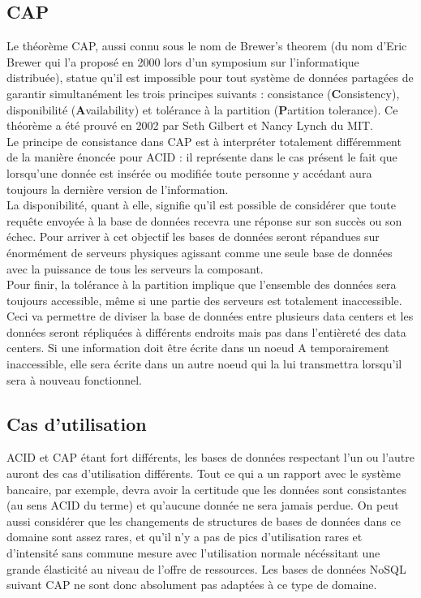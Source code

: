 \documentclass[11pt]{article}
\begin{document}
\subsection{CAP}
Le théorème CAP, aussi connu sous le nom de Brewer's theorem (du nom d'Eric Brewer qui l'a proposé en 2000 lors d'un symposium sur l'informatique distribuée), statue qu'il est impossible pour tout système de données partagées de garantir simultanément les trois principes suivants : consistance (\textbf{C}onsistency), disponibilité (\textbf{A}vailability) et tolérance à la partition (\textbf{P}artition tolerance). Ce théorème a été prouvé en 2002 par Seth Gilbert et Nancy Lynch du MIT\cite{cap}. \\
Le principe de consistance dans CAP est à interpréter totalement différemment de la manière énoncée pour ACID : il représente dans le cas présent le fait que lorsqu'une donnée est insérée ou modifiée toute personne y accédant aura toujours la dernière version de l'information. \\
La disponibilité, quant à elle, signifie qu'il est possible de considérer que toute requête envoyée à la base de données recevra une réponse sur son succès ou son échec. Pour arriver à cet objectif les bases de données seront répandues sur énormément de serveurs physiques agissant comme une seule base de données avec la puissance de tous les serveurs la composant. \\
Pour finir, la tolérance à la partition implique que l'ensemble des données sera toujours accessible, même si une partie des serveurs est totalement inaccessible. Ceci va permettre de diviser la base de données entre plusieurs data centers et les données seront répliquées à différents endroits mais pas dans l'entièreté des data centers. Si une information doit être écrite dans un noeud A temporairement inaccessible, elle sera écrite dans un autre noeud qui la lui transmettra lorsqu'il sera à nouveau fonctionnel. 
\subsection{Cas d'utilisation}
ACID et CAP étant fort différents, les bases de données respectant l'un ou l'autre auront des cas d'utilisation différents. Tout ce qui a un rapport avec le système bancaire, par exemple, devra avoir la certitude que les données sont consistantes (au sens ACID du terme) et qu'aucune donnée ne sera jamais perdue. On peut aussi considérer que les changements de structures de bases de données dans ce domaine sont assez rares, et qu'il n'y a pas de pics d'utilisation rares et d'intensité sans commune mesure avec l'utilisation normale nécéssitant une grande élasticité au niveau de l'offre de ressources. Les bases de données NoSQL suivant CAP ne sont donc absolument pas adaptées à ce type de domaine. %
\end{document}
